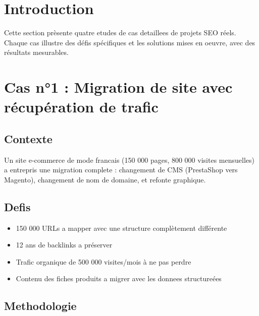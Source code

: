 \section{Introduction}

Cette section prèsente quatre etudes de cas detaillees de projets SEO réels. Chaque cas illustre des défis spécifiques et les solutions mises en oeuvre, avec des résultats mesurables.

\section{Cas n°1 : Migration de site avec récupération de trafic}

\subsection{Contexte}

Un site e-commerce de mode francais (150 000 pages, 800 000 visites mensuelles) a entrepris une migration complete : changement de CMS (PrestaShop vers Magento), changement de nom de domaine, et refonte graphique.

\subsection{Defis}

\begin{itemize}
    \item 150 000 URLs a mapper avec une structure complètement différente
    \item 12 ans de backlinks a préserver
    \item Trafic organique de 500 000 visites/mois à ne pas perdre
    \item Contenu des fiches produits a migrer avec les donnees structureées
\end{itemize}

\subsection{Methodologie}

